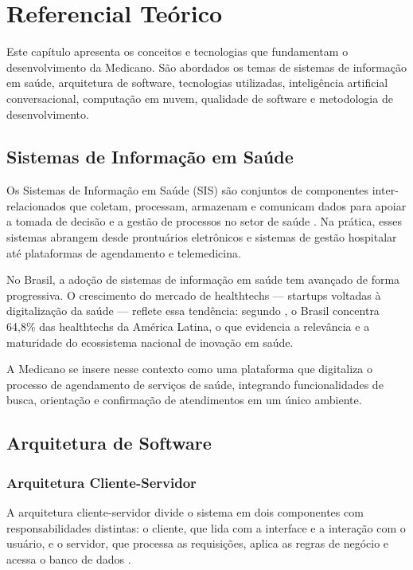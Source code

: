 \chapter{Referencial Teórico}
\label{chap:theoretical-background}

Este capítulo apresenta os conceitos e tecnologias que
fundamentam o desenvolvimento da Medicano. São abordados
os temas de sistemas de informação em saúde, arquitetura
de software, tecnologias utilizadas, inteligência artificial
conversacional, computação em nuvem, qualidade de software
e metodologia de desenvolvimento.

\section{Sistemas de Informação em Saúde}
\label{sec:health-information-systems}

Os Sistemas de Informação em Saúde (SIS) são conjuntos de
componentes inter-relacionados que coletam, processam,
armazenam e comunicam dados para apoiar a tomada de decisão
e a gestão de processos no setor de saúde \cite{laudon2014}.
Na prática, esses sistemas abrangem desde prontuários
eletrônicos e sistemas de gestão hospitalar até plataformas
de agendamento e telemedicina.

No Brasil, a adoção de sistemas de informação em saúde
tem avançado de forma progressiva. O crescimento do
mercado de healthtechs — startups voltadas à digitalização
da saúde — reflete essa tendência: segundo
, o Brasil concentra 64,8\% das
healthtechs da América Latina, o que evidencia a
relevância e a maturidade do ecossistema nacional de
inovação em saúde.

A Medicano se insere nesse contexto como uma plataforma
que digitaliza o processo de agendamento de serviços de
saúde, integrando funcionalidades de busca, orientação e
confirmação de atendimentos em um único ambiente.

\section{Arquitetura de Software}
\label{sec:software-architecture}

\subsection{Arquitetura Cliente-Servidor}
\label{subsec:client-server}

A arquitetura cliente-servidor divide o sistema em dois
componentes com responsabilidades distintas: o cliente,
que lida com a interface e a interação com o usuário, e
o servidor, que processa as requisições, aplica as regras
de negócio e acessa o banco de dados \cite{sommerville2011}.

